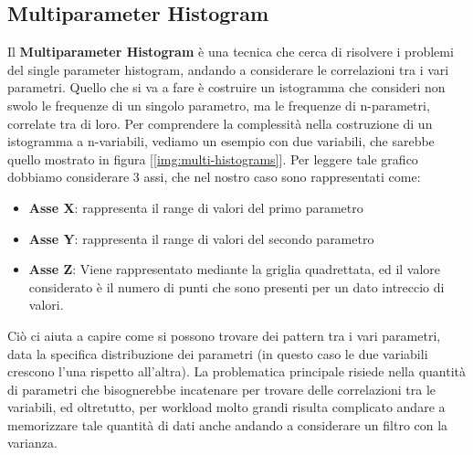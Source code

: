 \subsection{Multiparameter Histogram}
Il \textbf{Multiparameter Histogram} è una tecnica che cerca di risolvere i problemi del single parameter histogram, andando a considerare le correlazioni tra i vari parametri. Quello che si va a fare è costruire un istogramma che consideri non swolo le frequenze di un singolo parametro, ma le frequenze di n-parametri, correlate tra di loro. Per comprendere la complessità nella costruzione di un istogramma a n-variabili, vediamo un esempio con due variabili, che sarebbe quello mostrato in figura [\ref{img:multi-histograms}]. Per leggere tale grafico dobbiamo considerare 3 assi, che nel nostro caso sono rappresentati come:
\begin{itemize}
    \item \textbf{Asse X}: rappresenta il range di valori del primo parametro
    \item \textbf{Asse Y}: rappresenta il range di valori del secondo parametro
    \item \textbf{Asse Z}: Viene rappresentato mediante la griglia quadrettata, ed il valore considerato è il numero di punti che sono presenti per un dato intreccio di valori.
\end{itemize}

Ciò ci aiuta a capire come si possono trovare dei pattern tra i vari parametri, data la specifica distribuzione dei parametri (in questo caso le due variabili crescono l'una rispetto all'altra). La problematica principale risiede nella quantità di parametri che bisognerebbe incatenare per trovare delle correlazioni tra le variabili, ed oltretutto, per workload molto grandi risulta complicato andare a memorizzare tale quantità di dati anche andando a considerare un filtro con la varianza.

